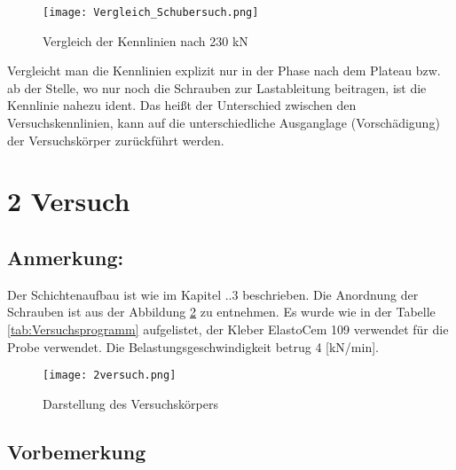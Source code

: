 \documentclass[12 pt,a4 paper ]{scrreprt}
\begin{document}
\begin{figure}
\begin{center}
\texttt{[image: Vergleich\_Schubersuch.png]}
\caption{Vergleich der Kennlinien nach 230 kN}
\label{VergleichSchubersuch}
\end{center}
\end{figure}

Vergleicht man die Kennlinien explizit nur in der Phase nach dem Plateau bzw. ab der Stelle, wo nur noch die Schrauben zur Lastableitung beitragen, ist die Kennlinie nahezu ident. Das heißt der Unterschied zwischen den Versuchskennlinien, kann auf die unterschiedliche Ausganglage (Vorschädigung) der Versuchskörper zurückführt werden. 


\section{2 Versuch}

\subsection{Anmerkung:}

Der Schichtenaufbau ist wie im Kapitel ..3 beschrieben. Die Anordnung der Schrauben ist aus der Abbildung \ref{2versuch} zu entnehmen. Es wurde wie in der Tabelle \ref{tab:Versuchsprogramm}  aufgelistet, der Kleber ElastoCem 109 verwendet für die Probe verwendet. Die Belastungsgeschwindigkeit betrug 4 [kN/min].
\begin{figure}
\begin{center}
\texttt{[image: 2versuch.png]}
\caption{Darstellung des Versuchskörpers}
\label{2versuch}
\end{center}
\end{figure}



\subsection{Vorbemerkung}
\end{document}
